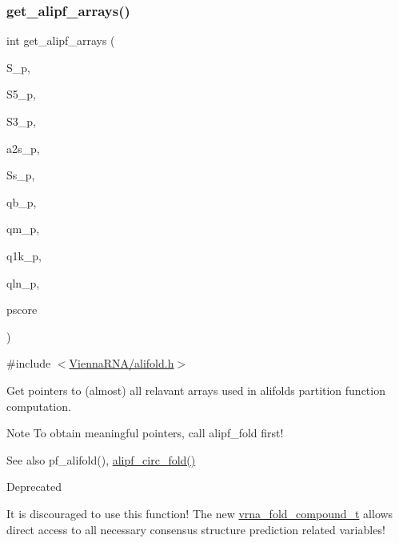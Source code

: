 \subsubsection{\texorpdfstring{get\+\_\+alipf\+\_\+arrays()}{get\_alipf\_arrays()}}
{\footnotesize\ttfamily int get\+\_\+alipf\+\_\+arrays (\begin{DoxyParamCaption}\item[{short $\ast$$\ast$$\ast$}]{S\+\_\+p,  }\item[{short $\ast$$\ast$$\ast$}]{S5\+\_\+p,  }\item[{short $\ast$$\ast$$\ast$}]{S3\+\_\+p,  }\item[{unsigned short $\ast$$\ast$$\ast$}]{a2s\+\_\+p,  }\item[{char $\ast$$\ast$$\ast$}]{Ss\+\_\+p,  }\item[{\hyperlink{group__data__structures_ga31125aeace516926bf7f251f759b6126}{F\+L\+T\+\_\+\+O\+R\+\_\+\+D\+BL} $\ast$$\ast$}]{qb\+\_\+p,  }\item[{\hyperlink{group__data__structures_ga31125aeace516926bf7f251f759b6126}{F\+L\+T\+\_\+\+O\+R\+\_\+\+D\+BL} $\ast$$\ast$}]{qm\+\_\+p,  }\item[{\hyperlink{group__data__structures_ga31125aeace516926bf7f251f759b6126}{F\+L\+T\+\_\+\+O\+R\+\_\+\+D\+BL} $\ast$$\ast$}]{q1k\+\_\+p,  }\item[{\hyperlink{group__data__structures_ga31125aeace516926bf7f251f759b6126}{F\+L\+T\+\_\+\+O\+R\+\_\+\+D\+BL} $\ast$$\ast$}]{qln\+\_\+p,  }\item[{short $\ast$$\ast$}]{pscore }\end{DoxyParamCaption})}



{\ttfamily \#include $<$\hyperlink{alifold_8h}{Vienna\+R\+N\+A/alifold.\+h}$>$}



Get pointers to (almost) all relavant arrays used in alifold\textquotesingle{}s partition function computation. 

\begin{DoxyNote}{Note}
To obtain meaningful pointers, call alipf\+\_\+fold first!
\end{DoxyNote}
\begin{DoxySeeAlso}{See also}
pf\+\_\+alifold(), \hyperlink{group__consensus__pf__fold_ga604a42ad64178279551ad3e4def3d603}{alipf\+\_\+circ\+\_\+fold()}
\end{DoxySeeAlso}
\begin{DoxyRefDesc}{Deprecated}
\item[\hyperlink{deprecated__deprecated000024}{Deprecated}]It is discouraged to use this function! The new \hyperlink{group__fold__compound_ga1b0cef17fd40466cef5968eaeeff6166}{vrna\+\_\+fold\+\_\+compound\+\_\+t} allows direct access to all necessary consensus structure prediction related variables!\end{DoxyRefDesc}


